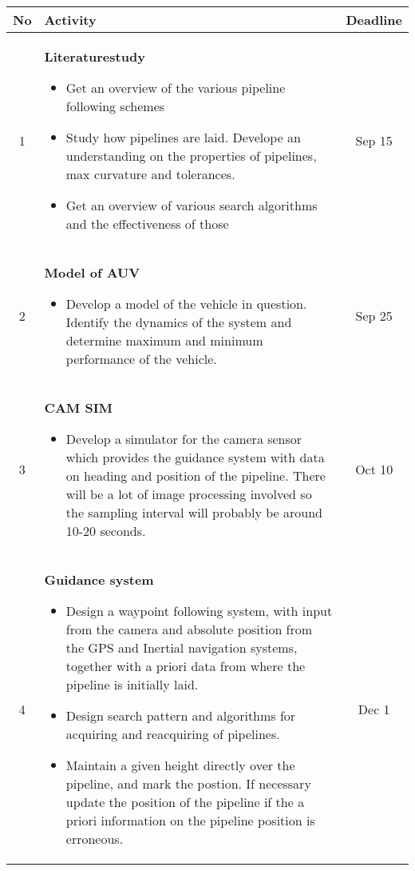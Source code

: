 \documentclass[a4paper,10pt]{article}
\begin{document}
	\begin{tabular}{| c | p{9cm} || c |}
	\hline
	No 	&	Activity	&	Deadline \\
	\hline
	\hline
	1	&	\textbf{Literaturestudy}\begin{itemize}
	 	 				 \item Get an overview of the various pipeline following schemes
	 	 				 \item Study how pipelines are laid. Develope an understanding on the properties of pipelines, max curvature and tolerances.
	 	 				 \item Get an overview of various search algorithms and the effectiveness of those
	 	 				\end{itemize}	
								& 	Sep 15\\
	\hline
	2	&	\textbf{Model of AUV}	\begin{itemize}
	 	 	            		 \item Develop a model of the vehicle in question. Identify the dynamics of the system and determine maximum and minimum performance of the vehicle.
	 	 	            		\end{itemize}
								&	Sep 25\\
	\hline
	3	&	\textbf{CAM SIM}	\begin{itemize}
	 	 	       			 \item Develop a simulator for the camera sensor which provides the guidance system with data on heading and position of the pipeline. There will be a lot of image processing involved so the sampling interval will probably be around 10-20 seconds.
	 	 	       			\end{itemize}
								&	Oct 10 \\
	\hline
	4	&	\textbf{Guidance system}\begin{itemize}
	 	 	               		 \item Design a waypoint following system, with input from the camera and absolute position from the GPS and Inertial navigation systems, together with a priori data from where the pipeline is initially laid. 
	 	 	               		 \item Design search pattern and algorithms for acquiring and reacquiring of pipelines. 
	 	 	               		 \item Maintain a given height directly over the pipeline, and mark the postion. If necessary update the position of the pipeline if the a priori information on the pipeline position is erroneous. 
	 	 	               		\end{itemize}
								&	Dec 1 \\

\end{tabular}
\end{document}
